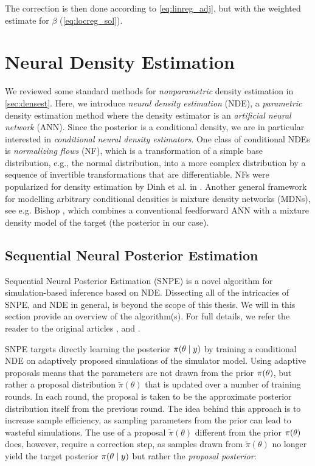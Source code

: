 The correction is then done according to \autoref{eq:linreg_adj}, but with the weighted estimate for $\beta$ (\autoref{eq:locreg_sol}).




\section{Neural Density Estimation}

We reviewed some standard methods for \textit{nonparametric} density estimation in \cref{sec:densest}. Here, we introduce \textit{neural density estimation} (NDE), a \textit{parametric} density estimation method where the density estimator is an \textit{artificial neural network} (ANN). Since the posterior is a conditional density, we are in particular interested in \textit{conditional neural density estimators}. One class of conditional NDEs is \textit{normalizing flows} (NF), which is a transformation of a simple base distribution, e.g., the normal distribution, into a more complex distribution by a sequence of invertible transformations that are differentiable. NFs were popularized for density estimation by Dinh et al. in \cite{dinh2015nice}. Another general framework for modelling arbitrary conditional densities is mixture density networks (MDNs), see e.g. Bishop \cite{Bishop}, which combines a conventional feedforward ANN with a mixture density model of the target (the posterior in our case). 


\subsection{Sequential Neural Posterior Estimation}

Sequential Neural Posterior Estimation (SNPE) is a novel algorithm for simulation-based inference based on NDE. Dissecting all of the intricacies of SNPE, and NDE in general, is beyond the scope of this thesis. We will in this section provide an overview of the algorithm(s). For full details, we refer the reader to the original articles \cite{SNL_first}, \cite{SNPE_first} and \cite{SNPE_apt}.

SNPE targets directly learning the posterior $\pi \qty(\theta \mid y)$ by training a conditional NDE on adaptively proposed simulations of the simulator model. Using adaptive proposals means that the parameters are not drawn from the prior $\pi \qty(\theta)$, but rather a proposal distribution $\tilde{\pi}(\theta)$ that is updated over a number of training rounds. In each round, the proposal is taken to be the approximate posterior distribution itself from the previous round. The idea behind this approach is to increase sample efficiency, as sampling parameters from the prior can lead to wasteful simulations. The use of a proposal $\tilde{\pi}(\theta)$ different from the prior $\pi \qty(\theta)$ does, however, require a correction step, as samples drawn from $\tilde{\pi}(\theta)$ no longer yield the target posterior $\pi \qty(\theta \mid y)$ but rather the \textit{proposal posterior}:

